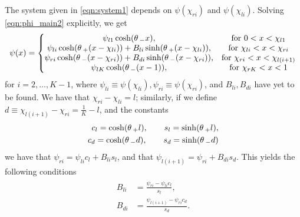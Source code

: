 The system given in \eqref{eqn:system1} depends on $\psi(\chi_{ri})$ and $\psi(\chi_{li})$. Solving \eqref{eqn:phi_main2} explicitly, we get
% 
\begin{equation}
\label{eqn:psi_soln}
	\begin{split}
	\psi(x)
   = \left\{
	\begin{matrix}
		\psi_{l1}\cosh(\theta\,_-x),& \text{for  }0<x<\chi_{l1}\\
		\psi_{li}\cosh(\theta\,_+(x-\chi_{li})) + B_{li}\sinh(\theta\,_+(x-\chi_{li})),& \text{for  }\chi_{li}<x<\chi_{ri}\\
		\psi_{ri}\cosh(\theta\,_-(x-\chi_{ri})) + B_{di}\sinh(\theta\,_-(x-\chi_{ri})),& \text{for  }\chi_{ri}<x<\chi_{l(i+1)}\\
		\psi_{lK}\cosh(\theta\,_-(x-1)),& \text{for  }\chi_{rK}<x<1
	\end{matrix}\right.
	\end{split}
\end{equation}
% 
for $i=2,\ldots,K-1$, where $\psi_{li}\equiv \psi(\chi_{li}), \psi_{ri}\equiv \psi(\chi_{ri})$, and $B_{li},B_{di}$ have yet to be found. We have that $\chi_{ri} - \chi_{li} = l$; similarly, if we define $d\equiv\chi_{l(i+1)} - \chi_{ri} = \frac{1}{K} - l$, and the constants
% 
\begin{equation*}
\begin{split}
\begin{aligned}
  c_l = \cosh(\theta\,_+l),\qquad s_l = \sinh(\theta\,_+l),\\
  c_d = \cosh(\theta\,_-d),\qquad s_d = \sinh(\theta\,_-d)
\end{aligned}
\end{split}
\end{equation*}
% 
we have that $\psi_{ri} = \psi_{li}c_l + B_{li}s_l$, and that $\psi_{l(i+1)} = \psi_{ri} + B_{di}s_d$. This yields the following conditions
% 
\begin{equation*}
\begin{split}
\begin{aligned}
  B_{li} &= \frac{\psi_{ri} - \psi_{li}c_l}{s_l},\\
  B_{di} &= \frac{\psi_{l(i+1)} - \psi_{ri}c_d}{s_d}.\\
\end{aligned}
\end{split}
\end{equation*}
% 

